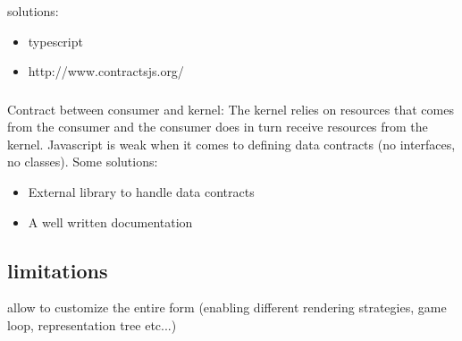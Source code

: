 solutions:

\begin{itemize}
  \item typescript 
  \item http://www.contractsjs.org/
\end{itemize}

\subsubsection{}


Contract between consumer and kernel: The kernel relies on resources that comes from the consumer and the consumer does in turn receive resources from the kernel. Javascript is weak when it comes to defining data contracts (no interfaces, no classes). Some solutions:
\begin{itemize}
\item External library to handle data contracts
\item A well written documentation
\end{itemize}



\subsection{limitations }


allow to customize the entire form (enabling different rendering strategies, game loop, representation tree etc...)